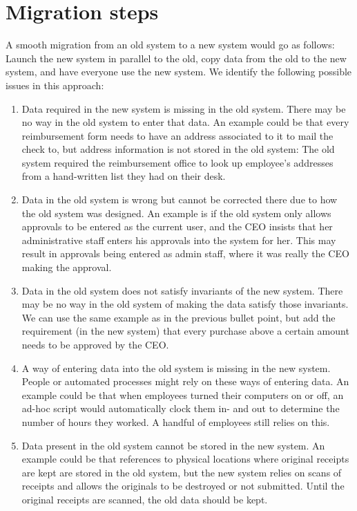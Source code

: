 \documentclass{elsarticle}
\begin{document}
\section{Migration steps}
	A smooth migration from an old system to a new system would go as follows:
	Launch the new system in parallel to the old, copy data from the old to the new system, and have everyone use the new system.
	We identify the following possible issues in this approach:

	\begin{enumerate}
	\item Data required in the new system is missing in the old system.
	There may be no way in the old system to enter that data.
	An example could be that every reimbursement form needs to have an address associated to it to mail the check to, but address information is not stored in the old system:
	The old system required the reimbursement office to look up employee's addresses from a hand-written list they had on their desk.
	\item Data in the old system is wrong but cannot be corrected there due to how the old system was designed.
	An example is if the old system only allows approvals to be entered as the current user, and the CEO insists that her administrative staff enters his approvals into the system for her.
	This may result in approvals being entered as admin staff, where it was really the CEO making the approval.
	\item Data in the old system does not satisfy invariants of the new system.
	There may be no way in the old system of making the data satisfy those invariants. We can use the same example as in the previous bullet point, but add the requirement (in the new system) that every purchase above a certain amount needs to be approved by the CEO.
	\item A way of entering data into the old system is missing in the new system.
	People or automated processes might rely on these ways of entering data.
	An example could be that when employees turned their computers on or off, an ad-hoc script would automatically clock them in- and out to determine the number of hours they worked.
	A handful of employees still relies on this.
	\item Data present in the old system cannot be stored in the new system.
	An example could be that references to physical locations where original receipts are kept are stored in the old system, but the new system relies on scans of receipts and allows the originals to be destroyed or not submitted.
	Until the original receipts are scanned, the old data should be kept.
	\end{enumerate}
	
\end{document}
